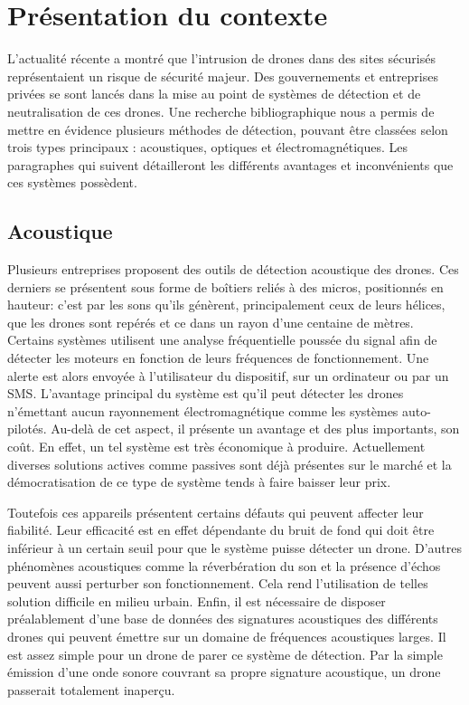 

\chapter{Présentation du contexte}

L'actualité récente a montré que l'intrusion de drones dans des sites sécurisés représentaient un risque de sécurité majeur. Des gouvernements et entreprises privées se sont lancés dans la mise au point de systèmes de détection et de neutralisation de ces drones. Une recherche bibliographique nous a permis de mettre en évidence plusieurs méthodes de détection, pouvant être classées selon trois types principaux : acoustiques, optiques et électromagnétiques.  
Les paragraphes qui suivent détailleront les différents avantages et inconvénients que ces systèmes possèdent.

\section{Acoustique}

Plusieurs entreprises proposent des outils de détection acoustique des drones. Ces derniers se présentent sous forme de boîtiers reliés à des micros, positionnés en hauteur: c'est par les sons qu'ils génèrent, principalement ceux de leurs hélices, que les drones sont repérés et ce dans un rayon d'une centaine de mètres. Certains systèmes utilisent une analyse fréquentielle poussée du signal afin de détecter les moteurs en fonction de leurs fréquences de fonctionnement. Une alerte est alors envoyée à l'utilisateur du dispositif, sur un ordinateur ou par un SMS. L'avantage principal du système est qu'il peut détecter les drones n'émettant aucun rayonnement électromagnétique comme les systèmes auto-pilotés. Au-delà de cet aspect, il présente un avantage et des plus importants, son coût. En effet, un tel système est très économique à produire. Actuellement diverses solutions actives comme passives sont déjà présentes sur le marché et la démocratisation de ce type de système tends à faire baisser leur prix.

Toutefois ces appareils présentent certains défauts qui peuvent affecter leur fiabilité. Leur efficacité est en effet dépendante du bruit de fond qui doit être inférieur à un certain seuil pour que le système puisse détecter un drone. D'autres phénomènes acoustiques comme la réverbération du son et la présence d'échos peuvent aussi perturber son fonctionnement. Cela rend l'utilisation de telles solution difficile en milieu urbain. Enfin, il est nécessaire de disposer préalablement d'une base de données des signatures acoustiques des différents drones qui peuvent émettre sur un domaine de fréquences acoustiques larges. Il est assez simple pour un drone de parer ce système de détection. Par la simple émission d'une onde sonore couvrant sa propre signature acoustique, un drone passerait totalement inaperçu.

